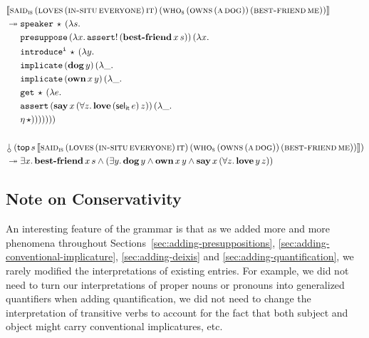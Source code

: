 \begin{align*}
& \sem{\app{\abs{said}_{\abs{is}}}{(\app{\abs{loves}}{(\ap{\abs{in-situ}}{\abs{everyone}})}{\abs{it}})}{(\app{\abs{who}_{\abs{s}}}{(\ap{\abs{owns}}{(\ap{\abs{a}}{\abs{dog}})})}{(\ap{\abs{best-friend}}{\abs{me}})})}} \\
& \tto \begin{aligned}[t]
      &\app{\op{speaker}}{\star}{(\lam{s}{ \\
      &\app{\op{presuppose}}{(\lam{x}{\ap{\op{assert}!}{(\app{\obj{best-friend}}{x}{s})}})}{(\lam{x}{ \\
      &\app{\op{introduce^i}}{\star}{(\lam{y}{ \\
      &\app{\op{implicate}}{(\ap{\obj{dog}}{y})}{(\lam{\_}{ \\
      &\app{\op{implicate}}{(\app{\obj{own}}{x}{y})}{(\lam{\_}{ \\
      &\app{\op{get}}{\star}{(\lam{e}{ \\
      &\app{\op{assert}}{(\app{\obj{say}}{x}{(\forall z.\, \app{\obj{love}}{(\ap{\selit}{e})}{z})})}{(\lam{\_}{ \\
      &\etaE{\star}})}})}})}})}})}})}})}
    \end{aligned} \\
  \\
& \ap{\cherry}{(\app{\TOP}{s}{\sem{\app{\abs{said}_{\abs{is}}}{(\app{\abs{loves}}{(\ap{\abs{in-situ}}{\abs{everyone}})}{\abs{it}})}{(\app{\abs{who}_{\abs{s}}}{(\ap{\abs{owns}}{(\ap{\abs{a}}{\abs{dog}})})}{(\ap{\abs{best-friend}}{\abs{me}})})}}})} \\
& \tto \exists x.\, \app{\obj{best-friend}}{x}{s} \land (\exists y.\, \ap{\obj{dog}}{y} \land \app{\obj{own}}{x}{y} \land \app{\obj{say}}{x}{(\forall z.\, \app{\obj{love}}{y}{z})})
\end{align*}


\subsection{Note on Conservativity}
\label{ssec:conservativity}

An interesting feature of the grammar is that as we added more and more
phenomena throughout Sections~\ref{sec:adding-presuppositions},
\ref{sec:adding-conventional-implicature}, \ref{sec:adding-deixis} and
\ref{sec:adding-quantification}, we rarely modified the interpretations of
existing entries. For example, we did not need to turn our interpretations
of proper nouns or pronouns into generalized quantifiers when adding
quantification, we did not need to change the interpretation of transitive
verbs to account for the fact that both subject and object might carry
conventional implicatures, etc.

